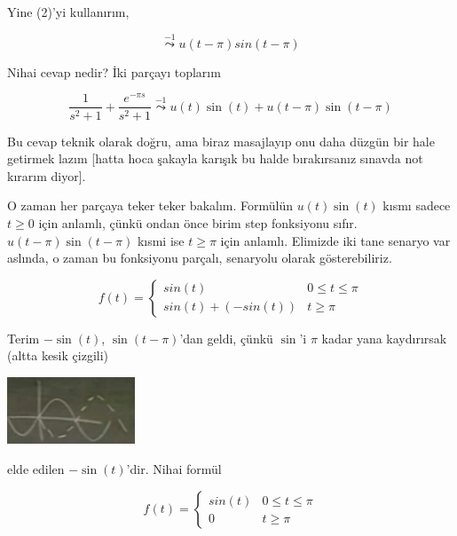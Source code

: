 \documentclass[12pt,fleqn]{article}\usepackage{../../common}
\begin{document}
Yine (2)'yi kullanırım, 

$$\stackrel{-1}{\leadsto} u(t-\pi)sin(t-\pi) $$

Nihai cevap nedir? İki parçayı toplarım

$$ \frac{1}{s^2+1} + \frac{e^{-\pi s}}{s^2 + 1} \stackrel{-1}{\leadsto} 
u(t)\sin(t) + u(t-\pi)\sin(t-\pi) 
$$

Bu cevap teknik olarak doğru, ama biraz masajlayıp onu daha düzgün bir hale
getirmek lazım [hatta hoca şakayla karışık bu halde bırakırsanız sınavda
not kırarım diyor]. 

O zaman her parçaya teker teker bakalım. Formülün $u(t)\sin(t)$ kısmı
sadece $t \ge 0$ için anlamlı, çünkü ondan önce birim step fonksiyonu
sıfır. $u(t-\pi)\sin(t-\pi) $ kısmi ise $t \ge \pi$ için anlamlı. Elimizde
iki tane senaryo var aslında, o zaman bu fonksiyonu parçalı, senaryolu
olarak gösterebiliriz. 

$$ 
f(t) = 
\left\{ \begin{array}{ll}
sin(t) & 0 \le t \le \pi \\
sin(t) + (-sin(t)) & t \ge \pi
\end{array} \right.
 $$

Terim $-\sin(t)$, $\sin(t-\pi)$'dan geldi, çünkü $\sin$'i $\pi$ kadar yana
kaydırırsak (altta kesik çizgili) 

\includegraphics[height=2cm]{22_10.png}

elde edilen $-\sin(t)$'dir. Nihai formül

$$ 
f(t) = 
\left\{ \begin{array}{ll}
sin(t) & 0 \le t \le \pi \\
0 & t \ge \pi
\end{array} \right.
 $$
\end{document}
